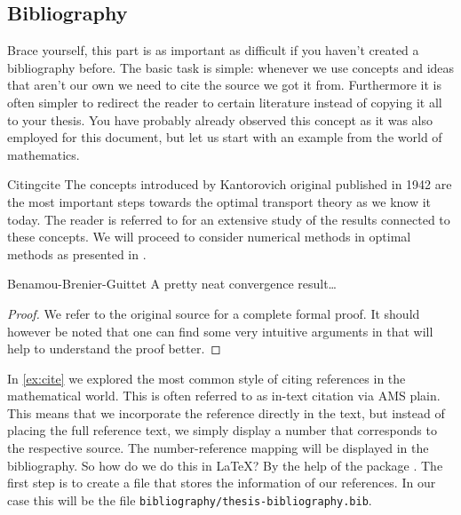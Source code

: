 \subsection{Bibliography} Brace yourself, this part is as important as difficult if you 
haven't created a bibliography before. The basic task is simple: whenever we use concepts 
and ideas that aren't our own we need to cite the source we got it from. Furthermore it 
is often simpler to redirect the reader to certain literature instead of copying it all 
to your thesis. You have probably already observed this concept as it was also employed 
for this document, but let us start with an example from the world of mathematics.
\begin{example}{Citing}{cite}
The concepts introduced by Kantorovich \cite{Kantorovich06} original published in 1942 are 
the most important steps towards the optimal transport theory as we know it today. 
The reader is referred to \cite{Villani03, Santa15} for an extensive study of the results 
connected to these concepts. We will proceed to consider numerical 
methods in optimal methods as presented in \cite[Ch. 6]{Santa15}.
\begin{theorem}{Benamou-Brenier-Guittet \cite{Ben02}}{}
A pretty neat convergence result\ldots
\end{theorem}
\begin{proof}
We refer to the original source for a complete formal proof. It should however be noted 
that one can find some very intuitive arguments in \cite[Ch. 6]{Santa15} that will 
help to understand the proof better.
\end{proof}
\end{example}
In \cref{ex:cite} we explored the most common style of citing references in the 
mathematical world. This is often referred to as in-text citation via AMS plain. 
This means that we incorporate the reference directly in the text, but instead of 
placing the full reference text, we simply display a number that corresponds to the 
respective source. The number-reference mapping will be displayed in the 
bibliography. So how do we  do this in \LaTeX? By the help of the package 
. The first step is to create 
a file that stores the information of our references. In our case this will be the file 
\texttt{bibliography/thesis-bibliography.bib}.
